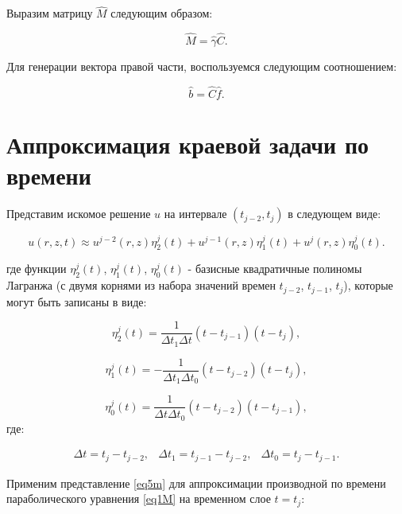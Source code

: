 Выразим матрицу $\hat{M}$ следующим образом:

\begin{equation*}
	\hat{M} = \hat{\gamma} \hat{C}.
\end{equation*}

Для генерации вектора правой части, воспользуемся следующим соотношением:

\begin{equation*}
	\hat{b} = \hat{C} \hat{f}.
\end{equation*}
 
 
\section{Аппроксимация краевой задачи по времени}

Представим искомое решение $u$ на интервале $\left(t_{j-2}, t_j\right)$ в следующем виде:

\begin{equation} \label{eq5m}
	u(r, z, t) \approx u^{j-2}(r, z)\eta_2^j(t) + u^{j-1}(r, z)\eta_1^j(t) + u^{j}(r, z)\eta_0^j(t).
\end{equation}

где функции $\eta_2^j(t)$, $\eta_1^j(t)$, $\eta_0^j(t)$ - базисные квадратичные полиномы Лагранжа (с двумя корнями из набора значений времен $t_{j-2}$, $t_{j-1}$, $t_j$), которые могут быть записаны в виде:

\begin{equation*}
	\eta_2^j(t) = \frac{1}{\Delta t_1 \Delta t} \left(t - t_{j-1}\right) \left(t-t_j\right),
\end{equation*}

\begin{equation*}
	\eta_1^j(t) = -\frac{1}{\Delta t_1 \Delta t_0} \left(t - t_{j-2}\right) \left(t-t_j\right),
\end{equation*}

\begin{equation*}
	\eta_0^j(t) = \frac{1}{\Delta t \Delta t_0} \left(t - t_{j-2}\right) \left(t-t_{j-1}\right),
\end{equation*}
где:

\begin{equation*}
	\begin{array}{ccc}
	\Delta t = t_j - t_{j - 2},&
	\Delta t_1 = t_{j - 1} - t_{j - 2},&
	\Delta t_0 = t_j - t_{j - 1}.
	\end{array}
\end{equation*}


Применим представление \ref{eq5m} для аппроксимации производной по времени параболического уравнения \ref{eq1M} на временном слое $t = t_j$:

